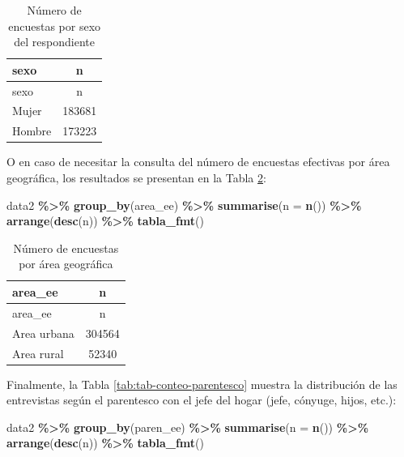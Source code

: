\documentclass[
  spanish,
  12pt,
]{book}
\newenvironment{Shaded}{\begin{snugshade}}{\end{snugshade}}
\newcommand{\AttributeTok}[1]{\textcolor[rgb]{0.13,0.29,0.53}{#1}}
\newcommand{\FunctionTok}[1]{\textcolor[rgb]{0.13,0.29,0.53}{\textbf{#1}}}
\newcommand{\NormalTok}[1]{#1}
\newcommand{\SpecialCharTok}[1]{\textcolor[rgb]{0.81,0.36,0.00}{\textbf{#1}}}
\begin{document}
\begin{longtable}[]{@{}lc@{}}
\caption{\label{tab:tab-conteo-sexo}Número de encuestas por sexo del respondiente}\tabularnewline
\toprule\noalign{}
sexo & n \\
\midrule\noalign{}
\endfirsthead
\toprule\noalign{}
sexo & n \\
\midrule\noalign{}
\endhead
\bottomrule\noalign{}
\endlastfoot
Mujer & 183681 \\
Hombre & 173223 \\
\end{longtable}

O en caso de necesitar la consulta del número de encuestas efectivas por área geográfica, los resultados se presentan en la Tabla \ref{tab:tab-conteo-area}:

\begin{Shaded}
\begin{Highlighting}[]
\NormalTok{data2 }\SpecialCharTok{\%\textgreater{}\%} 
  \FunctionTok{group\_by}\NormalTok{(area\_ee) }\SpecialCharTok{\%\textgreater{}\%} 
  \FunctionTok{summarise}\NormalTok{(}\AttributeTok{n =} \FunctionTok{n}\NormalTok{()) }\SpecialCharTok{\%\textgreater{}\%} 
  \FunctionTok{arrange}\NormalTok{(}\FunctionTok{desc}\NormalTok{(n)) }\SpecialCharTok{\%\textgreater{}\%}
  \FunctionTok{tabla\_fmt}\NormalTok{()}
\end{Highlighting}
\end{Shaded}

\begin{longtable}[]{@{}lc@{}}
\caption{\label{tab:tab-conteo-area}Número de encuestas por área geográfica}\tabularnewline
\toprule\noalign{}
area\_ee & n \\
\midrule\noalign{}
\endfirsthead
\toprule\noalign{}
area\_ee & n \\
\midrule\noalign{}
\endhead
\bottomrule\noalign{}
\endlastfoot
Area urbana & 304564 \\
Area rural & 52340 \\
\end{longtable}

Finalmente, la Tabla \ref{tab:tab-conteo-parentesco} muestra la distribución de las entrevistas según el parentesco con el jefe del hogar (jefe, cónyuge, hijos, etc.):

\begin{Shaded}
\begin{Highlighting}[]
\NormalTok{data2 }\SpecialCharTok{\%\textgreater{}\%} 
  \FunctionTok{group\_by}\NormalTok{(paren\_ee) }\SpecialCharTok{\%\textgreater{}\%} 
  \FunctionTok{summarise}\NormalTok{(}\AttributeTok{n =} \FunctionTok{n}\NormalTok{()) }\SpecialCharTok{\%\textgreater{}\%} 
  \FunctionTok{arrange}\NormalTok{(}\FunctionTok{desc}\NormalTok{(n)) }\SpecialCharTok{\%\textgreater{}\%}
  \FunctionTok{tabla\_fmt}\NormalTok{()}
\end{Highlighting}
\end{Shaded}
\end{document}
